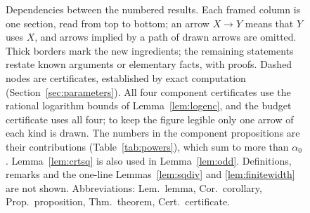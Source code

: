 \documentclass[11pt]{article}
\theoremstyle{definition}
\theoremstyle{remark}
\newcommand{\al}{\alpha_0}
\begin{document}
\begin{figure}[p]
\caption{Dependencies between the numbered results. Each framed column is one
section, read from top to bottom; an arrow $X\to Y$ means that $Y$ uses $X$,
and arrows implied by a path of drawn arrows are omitted. Thick borders mark
the new ingredients; the remaining statements restate known arguments or
elementary facts, with proofs. Dashed nodes are certificates, established by
exact computation (Section~\ref{sec:parameters}). All four component
certificates use the rational logarithm bounds of Lemma~\ref{lem:logenc}, and
the budget certificate uses all four; to keep the figure legible only one arrow
of each kind is drawn. The numbers in the component propositions are their
contributions (Table~\ref{tab:powers}), which sum to more than $\al$.
Lemma~\ref{lem:crtsq} is also used in Lemma~\ref{lem:odd}. Definitions,
remarks and the one-line Lemmas~\ref{lem:sqdiv} and \ref{lem:finitewidth} are
not shown. Abbreviations: Lem.\ lemma, Cor.\ corollary, Prop.\ proposition,
Thm.\ theorem, Cert.\ certificate.}\label{fig:dependency}
\end{figure}
\end{document}
